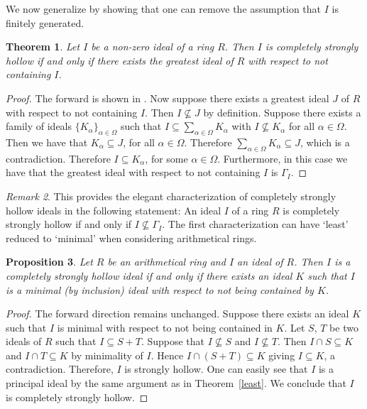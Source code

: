 \documentclass[11pt,english]{amsart}
\newtheorem{theorem}{Theorem}[section]
\newtheorem{proposition}[theorem]{Proposition}
\theoremstyle{definition}
\numberwithin{equation}{section}
\theoremstyle{remark}
\newtheorem{remark}[theorem]{Remark}
\begin{document}
We now generalize \cite[Theorem.~1.14]{Rostami2021} by showing that one can remove the assumption that $I$ is finitely generated. 
\begin{theorem}\label{Gamma}
    Let $I$ be a non-zero ideal of a ring $R$. Then $I$ is completely strongly hollow if and only if there exists the greatest ideal of $R$ with respect to not containing $I$.
\end{theorem}
\begin{proof}
    The forward is shown in \cite[Theorem.~1.14]{Rostami2021}. Now suppose there exists a greatest ideal $J$ of $R$ with respect to not containing $I$. Then $I\not\subseteq J$ by definition. Suppose there exists a family of ideals $\{K_\alpha\}_{\alpha \in \Omega}$ such that $I\subseteq \sum_{\alpha \in \Omega}K_\alpha$ with $I\not\subseteq K_\alpha$ for all $\alpha \in \Omega$. Then we have that $K_\alpha \subseteq J$, for all $\alpha \in \Omega$. Therefore $\sum_{\alpha\in \Omega}K_\alpha \subseteq J$, which is a contradiction. Therefore $I\subseteq K_\alpha$, for some $\alpha \in \Omega$. Furthermore, in this case we have that the greatest ideal with respect to not containing $I$ is $\Gamma_I$. 
\end{proof}

\begin{remark}
This provides the elegant characterization of completely strongly hollow ideals in the following statement: An ideal $I$ of a ring $R$ is completely strongly hollow if and only if $I\not\subseteq \Gamma_I$. The first characterization can have `least' reduced to `minimal' when considering arithmetical rings. 	
\end{remark}

\begin{proposition}
    Let $R$ be an arithmetical ring and $I$ an ideal of $R$. Then $I$ is a completely strongly hollow ideal if and only if there exists an ideal $K$ such that $I$ is a minimal (by inclusion) ideal with respect to not being contained by $K$.
\end{proposition}

\begin{proof}
    The forward direction remains unchanged. Suppose there exists an ideal $K$ such that $I$ is minimal with respect to not being contained in $K$. Let $S$, $T$ be two ideals of $R$ such that $I\subseteq S+T$. Suppose that $I\not\subseteq S$ and $I\not\subseteq T$. Then $I\cap S\subseteq K$ and $I\cap T\subseteq K$ by minimality of $I$. Hence $I\cap(S+T)\subseteq K$ giving $I\subseteq K$, a contradiction. Therefore, $I$ is strongly hollow. One can easily see that $I$ is a principal ideal by the same argument as in Theorem~\ref{least}. We conclude that $I$ is completely strongly hollow. 
\end{proof}
\end{document}
